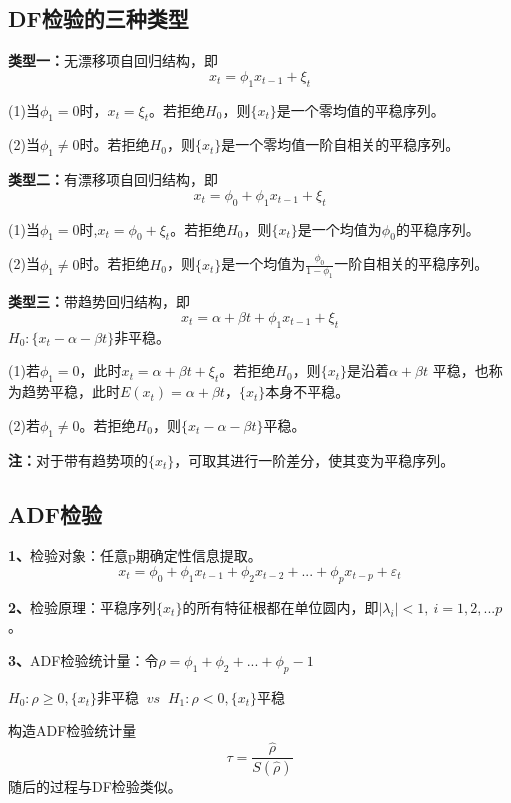 \documentclass[12pt, a4paper, oneside]{ctexbook}
\begin{document}
\subsection{DF检验的三种类型}
\textbf{类型一：}无漂移项自回归结构，即
\begin{equation}
    x_t=\phi_1x_{t-1}+\xi_t
\end{equation}

(1)当$\phi_1=0$时，$x_t = \xi_t$。若拒绝$H_0$，则$\{x_t\}$是一个零均值的平稳序列。

(2)当$\phi_1 \neq 0$时。若拒绝$H_0$，则$\{x_t\}$是一个零均值一阶自相关的平稳序列。

\textbf{类型二：}有漂移项自回归结构，即
\begin{equation}
    x_t=\phi_0 + \phi_1x_{t-1}+\xi_t
\end{equation}

(1)当$\phi_1=0$时,$x_t = \phi_0+\xi_t$。若拒绝$H_0$，则$\{x_t\}$是一个均值为$\phi_0$的平稳序列。

(2)当$\phi_1 \neq 0$时。若拒绝$H_0$，则$\{x_t\}$是一个均值为$\frac{\phi_0}{1-\phi_1}$一阶自相关的平稳序列。

\textbf{类型三：}带趋势回归结构，即
\begin{equation}
    x_t=\alpha+\beta t+\phi_1x_{t-1}+\xi_t
\end{equation}
$H_0:\{x_t - \alpha -\beta t\}$非平稳。

(1)若$\phi_1 = 0 $，此时$x_t = \alpha + \beta t + \xi_t$。若拒绝$H_0$，则$\{x_t\}$是沿着$\alpha + \beta t$
平稳，也称为趋势平稳，此时$E(x_t) = \alpha + \beta t$，$\{x_t\}$本身不平稳。

(2)若$\phi_1 \neq 0$。若拒绝$H_0$，则$\{x_t- \alpha -\beta t\}$平稳。

\textbf{注：}对于带有趋势项的$\{x_t\}$，可取其进行一阶差分，使其变为平稳序列。

\subsection{ADF检验}
\textbf{1、}检验对象：任意p期确定性信息提取。
\begin{equation*}
    x_t=\phi_0+\phi_1x_{t-1}+\phi_2x_{t-2}+...+\phi_{p}x_{t-p}+\varepsilon_{t}
\end{equation*}

\textbf{2、}检验原理：平稳序列$\{x_t\}$的所有特征根都在单位圆内，即$|\lambda_i| < 1,~i = 1,2,...p$。

\textbf{3、}ADF检验统计量：令$\rho = \phi_1 + \phi_2 + ... + \phi_p - 1$
\begin{center}
    $H_0:\rho \geq 0,\{x_t\}$非平稳 $~vs~$ $H_1:\rho < 0,\{x_t\}$平稳
\end{center}
构造ADF检验统计量
\begin{equation}
    \tau = \frac{\hat{\rho}}{S(\hat{\rho})}
\end{equation}
随后的过程与DF检验类似。
\end{document}

